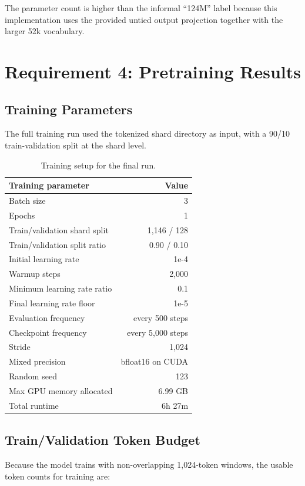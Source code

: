 \documentclass[11pt]{article}
\begin{document}
\noindent
The parameter count is higher than the informal ``124M'' label because this implementation uses the provided untied output projection together with the larger 52k vocabulary.

\section{Requirement 4: Pretraining Results}
\subsection{Training Parameters}
The full training run used the tokenized shard directory as input, with a 90/10 train-validation split at the shard level.

\begin{table}[H]
\centering
\begin{tabular}{lr}
\toprule
Training parameter & Value \\
\midrule
Batch size & 3 \\
Epochs & 1 \\
Train/validation shard split & 1,146 / 128 \\
Train/validation split ratio & 0.90 / 0.10 \\
Initial learning rate & 1e-4 \\
Warmup steps & 2,000 \\
Minimum learning rate ratio & 0.1 \\
Final learning rate floor & 1e-5 \\
Evaluation frequency & every 500 steps \\
Checkpoint frequency & every 5,000 steps \\
Stride & 1,024 \\
Mixed precision & bfloat16 on CUDA \\
Random seed & 123 \\
Max GPU memory allocated & 6.99 GB \\
Total runtime & 6h 27m \\
\bottomrule
\end{tabular}
\caption{Training setup for the final run.}
\end{table}

\subsection{Train/Validation Token Budget}
Because the model trains with non-overlapping 1,024-token windows, the usable token counts for training are:
\end{document}
